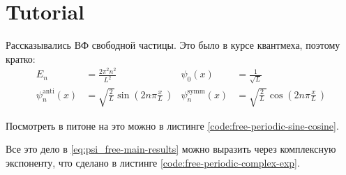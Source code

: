 \section{Tutorial}
Рассказывались ВФ свободной частицы.
Это было в курсе квантмеха, поэтому кратко: 
\begin{align}
    \label{eq:psi_free-main-results}
    \nonumber
    E_n &= \frac{2\pi^2n^2}{L^2} & \psi_0 (x) &= \frac{1}{\sqrt{L}} \\
    \psi_n^\text{anti} (x) &= \sqrt{\frac{2}{L}} \sin \left( 2n \pi \frac{x}{L}\, \right) & \psi_n^{\text{symm}} (x) &= \sqrt{\frac{2}{L}\,} \cos \left( 2n\pi \frac{x}{L}\, \right)
\end{align}

Посмотреть в питоне на это можно в листинге \ref{code:free-periodic-sine-cosine}.

Все это дело в \eqref{eq:psi_free-main-results} можно выразить через комплексную экспоненту, что сделано в листинге \ref{code:free-periodic-complex-exp}.

